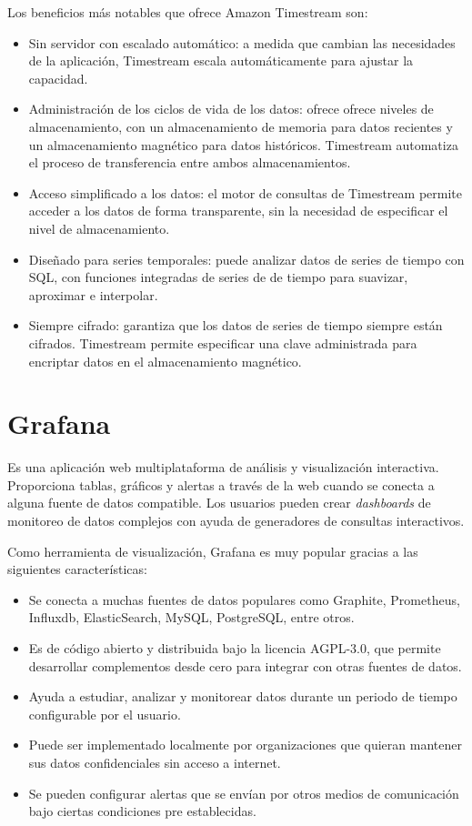 Los beneficios más notables que ofrece Amazon Timestream son:
\begin{itemize}
	\item Sin servidor con escalado automático: a medida que cambian las necesidades de la aplicación, Timestream escala automáticamente para ajustar la capacidad.
	\item Administración de los ciclos de vida de los datos: ofrece ofrece niveles de almacenamiento, con un almacenamiento de memoria para datos recientes y un almacenamiento magnético para datos históricos. Timestream automatiza el proceso de transferencia entre ambos almacenamientos.
	\item Acceso simplificado a los datos: el motor de consultas de Timestream permite acceder a los datos de forma transparente, sin la necesidad de especificar el nivel de almacenamiento.
	\item Diseñado para series temporales: puede analizar datos de series de tiempo con SQL, con funciones integradas de series de de tiempo para suavizar, aproximar e interpolar.
	\item Siempre cifrado: garantiza que los datos de series de tiempo siempre están cifrados. Timestream permite especificar una clave administrada para encriptar datos en el almacenamiento magnético.
	
\end{itemize}

\section{Grafana}
Es una aplicación web multiplataforma de análisis y visualización interactiva. Proporciona tablas, gráficos y alertas a través de la web cuando se conecta a alguna fuente de datos compatible. Los usuarios pueden crear \textit{dashboards} de monitoreo de datos complejos con ayuda de generadores de consultas interactivos.

Como herramienta de visualización, Grafana es muy popular gracias a las siguientes características:
\begin{itemize}
	\item Se conecta a muchas fuentes de datos populares como Graphite, Prometheus, Influxdb, ElasticSearch, MySQL, PostgreSQL, entre otros.
	\item Es de código abierto y distribuida bajo la licencia  AGPL-3.0, que permite desarrollar complementos desde cero para integrar con otras fuentes de datos.
	\item Ayuda a estudiar, analizar y monitorear datos durante un periodo de tiempo configurable por el usuario.
	\item Puede ser implementado localmente por organizaciones que quieran mantener sus datos confidenciales sin acceso a internet.
	\item Se pueden configurar alertas que se envían por otros medios de comunicación bajo ciertas condiciones pre establecidas.
\end{itemize}




